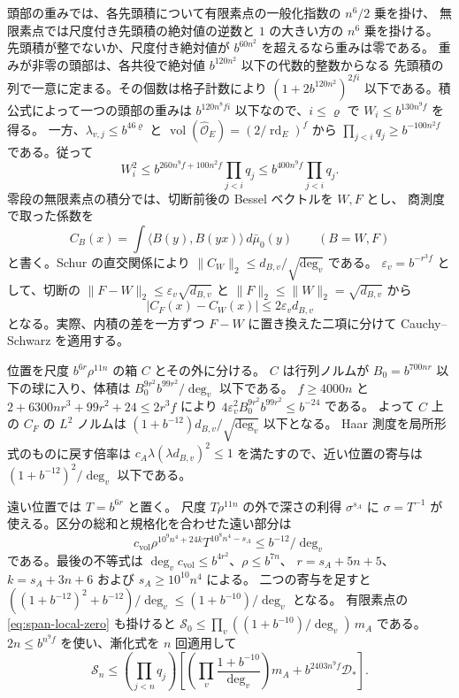 頭部の重みでは、各先頭積について有限素点の一般化指数の \(n^6/2\) 乗を掛け、
無限素点では尺度付き先頭積の絶対値の逆数と \(1\) の大きい方の \(n^6\) 乗を掛ける。
先頭積が整でないか、尺度付き絶対値が \(b^{60n^2}\) を超えるなら重みは零である。
重みが非零の頭部は、各共役で絶対値 \(b^{120n^2}\) 以下の代数的整数からなる
先頭積の列で一意に定まる。その個数は格子計数により
\((1+2b^{120n^2})^{2fi}\) 以下である。積公式によって一つの頭部の重みは
\(b^{120n^8fi}\) 以下なので、\(i\le\varrho\) で \(W_i\le b^{130n^9f}\) を得る。
一方、\(\lambda_{v,j}\le b^{46\varrho}\) と
\(\operatorname{vol}(\widehat{\mathcal O}_E)=(2/\operatorname{rd}_E)^f\) から
\(\prod_{j<i}q_j\ge b^{-100n^2f}\) である。従って
\[
 W_i^2\le b^{260n^9f+100n^2f}\prod_{j<i}q_j
       \le b^{400n^9f}\prod_{j<i}q_j .
\]
零段の無限素点の積分では、切断前後の Bessel ベクトルを \(W,F\) とし、
商測度で取った係数を
\[
 C_B(x)=\int\langle B(y),B(yx)\rangle\,d\bar\mu_0(y)
 \qquad(B=W,F)
\]
と書く。Schur の直交関係により \(\|C_W\|_2\le d_{B,v}/\sqrt{\deg_v}\) である。
\(\varepsilon_v=b^{-r^3 f}\) として、切断の
\(\|F-W\|_2\le\varepsilon_v\sqrt{d_{B,v}}\) と
\(\|F\|_2\le\|W\|_2=\sqrt{d_{B,v}}\) から
\[
 |C_F(x)-C_W(x)|\le2\varepsilon_v d_{B,v}
\]
となる。実際、内積の差を一方ずつ \(F-W\) に置き換えた二項に分けて
Cauchy--Schwarz を適用する。

位置を尺度 \(b^{6r}\rho^{11n}\) の箱 \(C\) とその外に分ける。
\(C\) は行列ノルムが \(B_0=b^{700nr}\) 以下の球に入り、体積は
\(B_0^{9r^2}b^{99r^2}/\deg_v\) 以下である。
\(f\ge4000n\) と
\(2+6300nr^3+99r^2+24\le 2r^3 f\) により
\(4\varepsilon_v^2 B_0^{9r^2}b^{99r^2}\le b^{-24}\) である。
よって \(C\) 上の \(C_F\) の \(L^2\) ノルムは
\((1+b^{-12})d_{B,v}/\sqrt{\deg_v}\) 以下となる。
Haar 測度を局所形式のものに戻す倍率は
\(c_A\lambda(\lambda d_{B,v})^2\le1\) を満たすので、近い位置の寄与は
\((1+b^{-12})^2/\deg_v\) 以下である。

遠い位置では \(T=b^{6r}\) と置く。
尺度 \(T\rho^{11n}\) の外で深さの利得 \(\sigma^{s_A}\) に
\(\sigma=T^{-1}\) が使える。区分の総和と規格化を合わせた遠い部分は
\[
 c_{\mathrm{vol}}\rho^{10^9n^4+24k}T^{10^8n^4-s_A}
 \le b^{-12}/\deg_v
\]
である。最後の不等式は
\(\deg_v c_{\mathrm{vol}}\le b^{4r^2}\)、\(\rho\le b^{7n}\)、
\(r=s_A+5n+5\)、\(k=s_A+3n+6\) および \(s_A\ge10^{10}n^4\) による。
二つの寄与を足すと
\(((1+b^{-12})^2+b^{-12})/\deg_v\le(1+b^{-10})/\deg_v\) となる。
有限素点の \eqref{eq:span-local-zero} も掛けると
\(\mathcal S_0\le \prod_v((1+b^{-10})/\deg_v)\,m_A\) である。
\(2n\le b^{n^9f}\) を使い、漸化式を \(n\) 回適用して
\begin{equation}\label{eq:span-sieve-sum}
 \mathcal S_n\le \left(\prod_{j<n}q_j\right)
  \left[
    \left(\prod_v\frac{1+b^{-10}}{\deg_v}\right)m_A
    + b^{2403n^9f}\mathcal D_\ast
  \right].
\end{equation}

